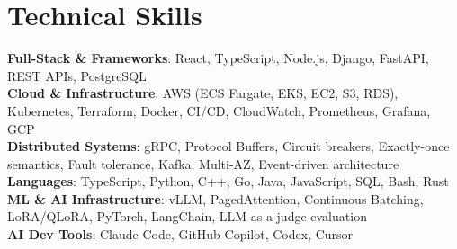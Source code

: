 \documentclass[letterpaper,11pt]{article}
\begin{document}
\section{Technical Skills}
\vspace{-7pt}
\begin{itemize}
[leftmargin=0.15in, label={}]\small{\item{
        \textbf{Full-Stack \& Frameworks}{: React, TypeScript, Node.js, Django, FastAPI, REST APIs, PostgreSQL} \\
        \textbf{Cloud \& Infrastructure}{: AWS (ECS Fargate, EKS, EC2, S3, RDS), Kubernetes, Terraform, Docker, CI/CD, CloudWatch, Prometheus, Grafana, GCP} \\
        \textbf{Distributed Systems}{: gRPC, Protocol Buffers, Circuit breakers, Exactly-once semantics, Fault tolerance, Kafka, Multi-AZ, Event-driven architecture} \\
        \textbf{Languages}{: TypeScript, Python, C++, Go, Java, JavaScript, SQL, Bash, Rust} \\
        \textbf{ML \& AI Infrastructure}{: vLLM, PagedAttention, Continuous Batching, LoRA/QLoRA, PyTorch, LangChain, LLM-as-a-judge evaluation} \\
        \textbf{AI Dev Tools}{: Claude Code, GitHub Copilot, Codex, Cursor} \\
}}
\end{itemize}
\end{document}

